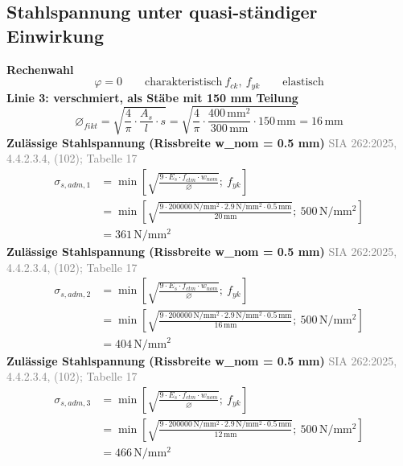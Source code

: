 \documentclass[11pt,a4paper]{article}
\newcommand{\normref}[1]{{\small\textcolor{gray}{#1}}}
\begin{document}
\subsection{Stahlspannung unter quasi-ständiger Einwirkung}
\noindent\textbf{Rechenwahl}
\begin{equation*}
\varphi = 0 \qquad \text{charakteristisch}\ f_{ck},\ f_{yk} \qquad \text{elastisch}
\end{equation*}
\noindent\textbf{Linie 3: verschmiert, als Stäbe mit 150 mm Teilung}
\begin{equation*}
\varnothing_{fikt} = \sqrt{\frac{4}{\pi} \cdot \frac{A_s}{l} \cdot s} = \sqrt{\frac{4}{\pi} \cdot \frac{400\,\mathrm{mm}^{2}}{300\,\mathrm{mm}} \cdot 150\,\mathrm{mm}} = 16\,\mathrm{mm}
\end{equation*}
\noindent\textbf{Zulässige Stahlspannung (Rissbreite w\_nom = 0.5 mm)} \hfill \normref{SIA 262:2025, 4.4.2.3.4, (102); Tabelle 17}
\begin{equation*}
\begin{aligned}
  \sigma_{s,adm,1} &= \min\left[\sqrt{\frac{9 \cdot E_s \cdot f_{ctm} \cdot w_{nom}}{\varnothing}};\ f_{yk}\right] \\
  &= \min\left[\sqrt{\frac{9 \cdot 200000\,\mathrm{N}/\mathrm{mm}^{2} \cdot 2.9\,\mathrm{N}/\mathrm{mm}^{2} \cdot 0.5\,\mathrm{mm}}{20\,\mathrm{mm}}};\ 500\,\mathrm{N}/\mathrm{mm}^{2}\right] \\
  &= 361\,\mathrm{N}/\mathrm{mm}^{2}
\end{aligned}
\end{equation*}
\noindent\textbf{Zulässige Stahlspannung (Rissbreite w\_nom = 0.5 mm)} \hfill \normref{SIA 262:2025, 4.4.2.3.4, (102); Tabelle 17}
\begin{equation*}
\begin{aligned}
  \sigma_{s,adm,2} &= \min\left[\sqrt{\frac{9 \cdot E_s \cdot f_{ctm} \cdot w_{nom}}{\varnothing}};\ f_{yk}\right] \\
  &= \min\left[\sqrt{\frac{9 \cdot 200000\,\mathrm{N}/\mathrm{mm}^{2} \cdot 2.9\,\mathrm{N}/\mathrm{mm}^{2} \cdot 0.5\,\mathrm{mm}}{16\,\mathrm{mm}}};\ 500\,\mathrm{N}/\mathrm{mm}^{2}\right] \\
  &= 404\,\mathrm{N}/\mathrm{mm}^{2}
\end{aligned}
\end{equation*}
\noindent\textbf{Zulässige Stahlspannung (Rissbreite w\_nom = 0.5 mm)} \hfill \normref{SIA 262:2025, 4.4.2.3.4, (102); Tabelle 17}
\begin{equation*}
\begin{aligned}
  \sigma_{s,adm,3} &= \min\left[\sqrt{\frac{9 \cdot E_s \cdot f_{ctm} \cdot w_{nom}}{\varnothing}};\ f_{yk}\right] \\
  &= \min\left[\sqrt{\frac{9 \cdot 200000\,\mathrm{N}/\mathrm{mm}^{2} \cdot 2.9\,\mathrm{N}/\mathrm{mm}^{2} \cdot 0.5\,\mathrm{mm}}{12\,\mathrm{mm}}};\ 500\,\mathrm{N}/\mathrm{mm}^{2}\right] \\
  &= 466\,\mathrm{N}/\mathrm{mm}^{2}
\end{aligned}
\end{equation*}
\end{document}
